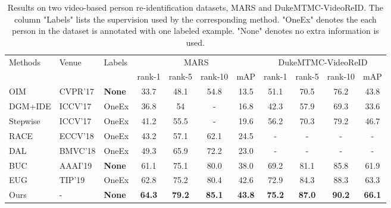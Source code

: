 \documentclass[journal]{IEEEtran}
\begin{document}
\begin{table*}[htb]
\caption{Results on two video-based person re-identification datasets, MARS and DukeMTMC-VideoReID. The column "Labels" lists the supervision used by the corresponding method. "OneEx" denotes the each person in the dataset is annotated with one labeled example. "None" denotes no extra information is used.}
\label{tab:mars_duke}
\begin{center}
\begin{tabular}{l|l|l|cccc|cccc}
\hline
\multirow{2}{*}{Methods} & \multirow{2}{*}{Venue}& \multirow{2}{*}{Labels} & \multicolumn{4}{c|}{MARS} & \multicolumn{4}{c}{DukeMTMC-VideoReID} \\ \cline{4-11}
 & & & rank-1 & rank-5 & rank-10 & mAP & rank-1 & rank-5 & rank-10 & mAP \\ \hline
OIM\cite{xiao2017joint} & CVPR'17 & \textbf{None} & 33.7 & 48.1 & 54.8 & 13.5 & 51.1 & 70.5 & 76.2 & 43.8 \\ 
DGM+IDE\cite{ye2019dynamic}& ICCV'17 & OneEx & 36.8 & 54 & - & 16.8 & 42.3 & 57.9 & 69.3 & 33.6 \\ 
Stepwise\cite{liu2017stepwise}& ICCV'17 & OneEx & 41.2 & 55.5 & - & 19.6 & 56.2 & 70.3 & 79.2 & 46.7 \\ 
RACE\cite{ye2018robust} & ECCV'18 & OneEx & 43.2 & 57.1 & 62.1 & 24.5 & - & - & - & - \\ 
DAL\cite{chen2018deep} & BMVC'18 & OneEx & 49.3 & 65.9 & 72.2 & 23.0 & - & - & - & - \\ 
BUC\cite{lin2019bottom} & AAAI'19 &\textbf{None} & 61.1 & 75.1 & 80.0 & 38.0 & 69.2 & 81.1 & 85.8 & 61.9 \\
EUG\cite{wu2019progressive} & TIP'19 & OneEx & 62.8 & 75.2 & 80.4 & 42.6 & 72.9 & 84.3 & 88.3 & 63.3 \\  \hline
Ours & - &\textbf{None} & \textbf{64.3} & \textbf{79.2} & \textbf{85.1} & \textbf{43.8} & \textbf{75.2} & \textbf{87.0} & \textbf{90.2} & \textbf{66.1} \\
\hline
\end{tabular}
\end{center}
\end{table*} 
\end{document}
